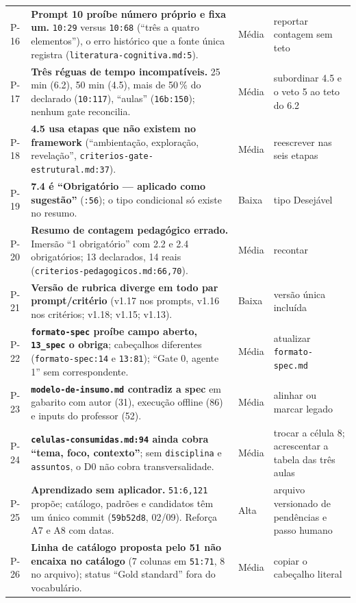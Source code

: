 \documentclass[11pt,a4paper]{article}
\begin{document}
\begin{longtable}{@{}p{0.9cm} >{\raggedright\arraybackslash}p{8.6cm} p{1.1cm} >{\raggedright\arraybackslash}p{4.9cm}@{}}
P-16 & \textbf{Prompt 10 proíbe número próprio e fixa um.} \texttt{10:29} versus \texttt{10:68} (``três a quatro elementos''), o erro histórico que a fonte única registra (\texttt{literatura-cognitiva.md:5}). & Média & reportar contagem sem teto \\
P-17 & \textbf{Três réguas de tempo incompatíveis.} 25 min (6.2), 50 min (4.5), mais de 50\,\% do declarado (\texttt{10:117}), ``aulas'' (\texttt{16b:150}); nenhum gate reconcilia. & Média & subordinar 4.5 e o veto 5 ao teto do 6.2 \\
P-18 & \textbf{4.5 usa etapas que não existem no framework} (``ambientação, exploração, revelação'', \texttt{criterios-gate-estrutural.md:37}). & Média & reescrever nas seis etapas \\
P-19 & \textbf{7.4 é ``Obrigatório --- aplicado como sugestão''} (\texttt{:56}); o tipo condicional só existe no resumo. & Baixa & tipo Desejável \\
P-20 & \textbf{Resumo de contagem pedagógico errado.} Imersão ``1 obrigatório'' com 2.2 e 2.4 obrigatórios; 13 declarados, 14 reais (\texttt{criterios-pedagogicos.md:66,70}). & Média & recontar \\
P-21 & \textbf{Versão de rubrica diverge em todo par prompt/critério} (v1.17 nos prompts, v1.16 nos critérios; v1.18; v1.15; v1.13). & Baixa & versão única incluída \\
P-22 & \textbf{\texttt{formato-spec} proíbe campo aberto, \texttt{13\_spec} o obriga}; cabeçalhos diferentes (\texttt{formato-spec:14} e \texttt{13:81}); ``Gate 0, agente 1'' sem correspondente. & Média & atualizar \texttt{formato-spec.md} \\
P-23 & \textbf{\texttt{modelo-de-insumo.md} contradiz a spec} em gabarito com autor (31), execução offline (86) e inputs do professor (52). & Média & alinhar ou marcar legado \\
P-24 & \textbf{\texttt{celulas-consumidas.md:94} ainda cobra ``tema, foco, contexto''}; sem \texttt{disciplina} e \texttt{assuntos}, o D0 não cobra transversalidade. & Média & trocar a célula 8; acrescentar a tabela das três aulas \\
P-25 & \textbf{Aprendizado sem aplicador.} \texttt{51:6,121} propõe; catálogo, padrões e candidatos têm um único commit (\texttt{59b52d8}, 02/09). Reforça A7 e A8 com datas. & Alta & arquivo versionado de pendências e passo humano \\
P-26 & \textbf{Linha de catálogo proposta pelo 51 não encaixa no catálogo} (7 colunas em \texttt{51:71}, 8 no arquivo); status ``Gold standard'' fora do vocabulário. & Média & copiar o cabeçalho literal \\

\end{longtable}
\end{document}
